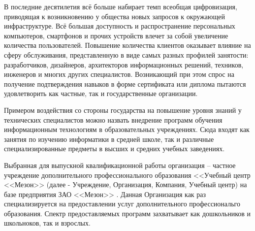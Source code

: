 



В последние десятилетия всё больше набирает темп всеобщая цифровизация, приводящая к возникновению у общества новых запросов к окружающей инфраструктуре.
Всё большая доступность и распространение персональных компьютеров, смартфонов и прочих устройств влечет за собой увеличение количества пользователей.
Повышение количества клиентов оказывает влияние на сферу обслуживания, представленную в виде самых разных профилей занятости: разработчиков, дизайнеров, архитекторов информационных решений, техников, инженеров и многих других специалистов.
Возникающий при этом спрос на получение подтверждения навыков в форме сертификата или диплома пытаются удовлетворить как частные, так и государственные организации.

Примером воздействия со стороны государства на повышение уровня знаний у технических специалистов можно назвать внедрение программ обучения информационным технологиям в образовательных учреждениях.
Сюда входят как занятия по изучению информатики в средней школе, так и различные специализированные предметы в высших и средних учебных заведениях.

Выбранная для выпускной квалификационной работы организация -- частное учреждение дополнительного профессионального образования <<Учебный центр <<Мезон>> \cite{meson-uc} (далее - Учреждение, Организация, Компания, Учебный центр) на базе предприятия ЗАО <<Мезон>> \cite{meson}.
Данная Организация как раз специализируется на предоставлении услуг дополнительного профессиональго образования.
Спектр предоставляемых программ захватывает как дошкольников и школьноков, так и взрослых.

